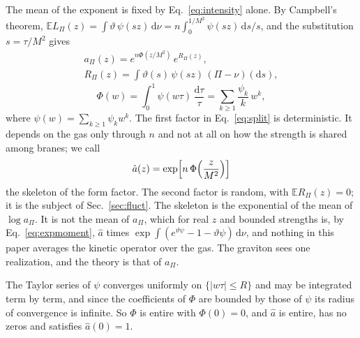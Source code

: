 \documentclass[a4paper,11pt]{article}
\newcommand{\bE}{\mathbb{E}}
\newcommand{\dd}{\mathrm{d}}
\begin{document}
The mean of the exponent is fixed by Eq.~\eqref{eq:intensity} alone. By Campbell's theorem, $\bE L_\Pi(z)=\int\vartheta\,\psi(sz)\,\dd\nu=n\int_0^{1/M^2}\psi(sz)\,\dd s/s$, and the substitution $s=\tau/M^2$ gives
\begin{equation}
\label{eq:split}
\begin{gathered}
a_\Pi(z)=e^{n\Phi(z/M^2)}\,e^{R_\Pi(z)},\\
R_\Pi(z)=\int\vartheta(s)\,\psi(sz)\,(\Pi-\nu)(\dd s),
\end{gathered}
\end{equation}
\begin{equation}
\label{eq:Phi}
\Phi(w)=\int_0^1\psi(w\tau)\,\frac{\dd\tau}{\tau}=\sum_{k\ge1}\frac{\psi_k}{k}\,w^k ,
\end{equation}
where $\psi(w)=\sum_{k\ge1}\psi_kw^k$. The first factor in Eq.~\eqref{eq:split} is deterministic. It depends on the gas only through $n$ and not at all on how the strength is shared among branes; we call
\begin{equation}
\label{eq:avg}
\hat a(z)=\exp\Bigl[n\,\Phi\Bigl(\frac z{M^2}\Bigr)\Bigr]
\end{equation}
the skeleton of the form factor. The second factor is random, with $\bE R_\Pi(z)=0$; it is the subject of Sec.~\ref{sec:fluct}. The skeleton is the exponential of the mean of $\log a_\Pi$. It is not the mean of $a_\Pi$, which for real $z$ and bounded strengths is, by Eq.~\eqref{eq:expmoment}, $\hat a$ times $\exp\int(e^{\vartheta\psi}-1-\vartheta\psi)\,\dd\nu$, and nothing in this paper averages the kinetic operator over the gas. The graviton sees one realization, and the theory is that of $a_\Pi$.

The Taylor series of $\psi$ converges uniformly on $\{|w\tau|\le R\}$ and may be integrated term by term, and since the coefficients of $\Phi$ are bounded by those of $\psi$ its radius of convergence is infinite. So $\Phi$ is entire with $\Phi(0)=0$, and $\hat a$ is entire, has no zeros and satisfies $\hat a(0)=1$.
\end{document}
